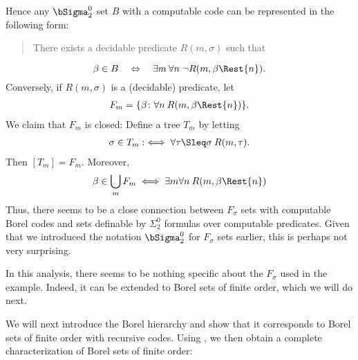 \documentclass[letterpaper,10pt,english]{jupyterBook}
\begin{document}
\sphinxAtStartPar
Hence any \(\bSigma^0_2\) set \(B\) with a computable code can be represented in the following form:
\begin{quote}

\sphinxAtStartPar
There exists a decidable predicate \(R(m,\sigma)\) such that
\end{quote}
\begin{equation*}
    \beta \in B \quad \Leftrightarrow \quad \exists m \: \forall n \; \neg R(m, \beta\Rest{n}). 
\end{equation*}
\sphinxAtStartPar
Conversely, if \(R(m,\sigma)\) is a (decidable) predicate, let
\begin{equation*}
\begin{split}
F_m = \{ \beta \colon \forall n \: R(m,\beta\Rest{n}) \}.
\end{split}
\end{equation*}
\sphinxAtStartPar
We claim that \(F_m\) is closed: Define a tree \(T_m\) by letting
\begin{equation*}
\begin{split}
\sigma \in T_m : \iff \forall \tau \Sleq \sigma \: R(m, \tau).
\end{split}
\end{equation*}
\sphinxAtStartPar
Then \([T_m] = F_m\). Moreover,
\begin{equation*}
\begin{split}
\beta \in \bigcup_m F_m \iff \exists m \forall n \: R(m,\beta\Rest{n})
\end{split}
\end{equation*}
\sphinxAtStartPar
Thus, there seems to be a close connection between \(F_\sigma\) sets with computable Borel codes and sets definable by \(\Sigma^0_2\) formulas over computable predicates. Given that we introduced the notation \(\bSigma^0_2\) for \(F_\sigma\) sets earlier, this is perhaps not very surprising.

\sphinxAtStartPar
In this analysis, there seems to be nothing specific about the \(F_\sigma\) used in the example. Indeed, it can be extended to Borel sets of finite order, which we will do next.

\sphinxAtStartPar
We will next introduce the
 Borel hierarchy and show that it corresponds to Borel sets of finite order with recursive codes. Using , we then obtain a complete characterization of Borel sets of finite order: 
\end{document}
